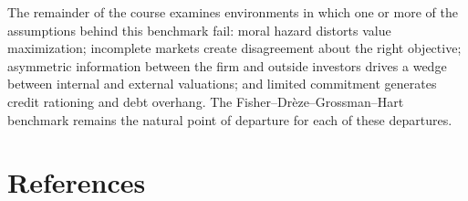\documentclass[11pt,a4paper]{article}
\theoremstyle{plain}
\theoremstyle{definition}
\theoremstyle{remark}
\begin{document}
The remainder of the course examines environments in which one or more of the assumptions behind this benchmark fail: moral hazard distorts value maximization; incomplete markets create disagreement about the right objective; asymmetric information between the firm and outside investors drives a wedge between internal and external valuations; and limited commitment generates credit rationing and debt overhang. The Fisher--Drèze--Grossman--Hart benchmark remains the natural point of departure for each of these departures.

\section*{References}
\end{document}
